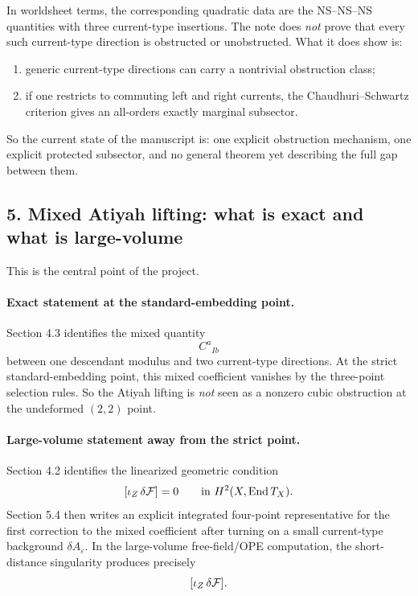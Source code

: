 \documentclass[11pt]{article}
\begin{document}
In worldsheet terms, the corresponding quadratic data are the NS--NS--NS quantities with three current-type insertions. The note does \emph{not} prove that every such current-type direction is obstructed or unobstructed. What it does show is:
\begin{enumerate}
\item generic current-type directions can carry a nontrivial obstruction class;
\item if one restricts to commuting left and right currents, the Chaudhuri--Schwartz criterion gives an all-orders exactly marginal subsector.
\end{enumerate}

So the current state of the manuscript is: one explicit obstruction mechanism, one explicit protected subsector, and no general theorem yet describing the full gap between them.

\subsection*{5. Mixed Atiyah lifting: what is exact and what is large-volume}

This is the central point of the project.

\paragraph*{Exact statement at the standard-embedding point.}
Section 4.3 identifies the mixed quantity
\[
C^a{}_{Ib}
\]
between one descendant modulus and two current-type directions. At the strict standard-embedding point, this mixed coefficient vanishes by the three-point selection rules. So the Atiyah lifting is \emph{not} seen as a nonzero cubic obstruction at the undeformed $(2,2)$ point.

\paragraph*{Large-volume statement away from the strict point.}
Section 4.2 identifies the linearized geometric condition
\[
[\iota_Z\,\delta{\cal F}]=0
\qquad\text{in } H^2(X,\mathrm{End}\,T_X).
\]
Section 5.4 then writes an explicit integrated four-point representative for the first correction to the mixed coefficient after turning on a small current-type background $\delta A_\varepsilon$. In the large-volume free-field/OPE computation, the short-distance singularity produces precisely
\[
[\iota_Z\,\delta{\cal F}].
\]
\end{document}
